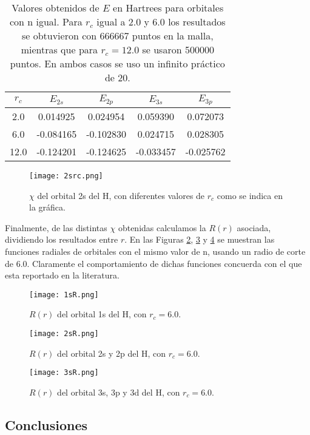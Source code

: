 \documentclass[12pt,a4paper]{report}
\begin{document}
\begin{table}[h]
\centering
\begin{tabular}{|c || c|c||c|c||}
\hline
$r_c$ & $E_{2s}$& $E_{2p}$&$E_{3s}$&$E_{3p}$\\
\hline
2.0   & 0.014925& 0.024954 & 0.059390 & 0.072073\\
6.0   & -0.084165& -0.102830 & 0.024715 & 0.028305\\
12.0   & -0.124201& -0.124625 & -0.033457 & -0.025762\\
\hline
\end{tabular}
\caption{Valores obtenidos de $E$ en Hartrees para orbitales con n igual. Para $r_c$ igual a 2.0 y 6.0 los resultados se obtuvieron con 666667 puntos en la malla, mientras que para $r_c=12.0$ se usaron 500000 puntos. En ambos casos se uso un infinito práctico de 20. \label{tab2}}
\end{table}

\begin{figure}[h]
\centering
\texttt{[image: 2src.png]}
\caption{$\chi$ del orbital 2s del H, con diferentes valores de $r_c$ como se indica en la gráfica.\label{2src}}
\end{figure}

Finalmente, de las distintas $\chi$ obtenidas calculamos la $R(r)$ asociada, dividiendo los resultados entre $r$. En las Figuras \ref{1sR}, \ref{2sR} y \ref{3sR} se muestran las funciones radiales de orbitales con el mismo valor de n, usando un radio de corte de 6.0. Claramente el comportamiento de dichas funciones concuerda con el que esta reportado en la literatura.

\begin{figure}[h]
\centering
\texttt{[image: 1sR.png]}
\caption{$R(r)$ del orbital 1s del H, con $r_c=6.0$.\label{1sR}}
\end{figure}

\begin{figure}[h]
\centering
\texttt{[image: 2sR.png]}
\caption{$R(r)$ del orbital 2s y 2p del H, con $r_c=6.0$.\label{2sR}}
\end{figure}

\begin{figure}[h]
\centering
\texttt{[image: 3sR.png]}
\caption{$R(r)$ del orbital 3s, 3p y 3d del H, con $r_c=6.0$.\label{3sR}}
\end{figure}

\subsection*{Conclusiones}
\end{document}
